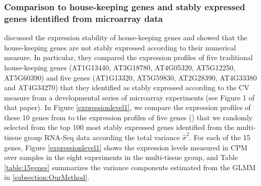 	
	
	\subsubsection{Comparison to house-keeping genes and stably expressed genes
		identified from microarray data}\label{section:CompareStablyExpressedGene}
	\citet{czechowski2005genome} discussed the expression stability of
	house-keeping genes and showed that the house-keeping genes are not stably
	expressed according to their numerical measure. In particular, they compared
	the expression profiles of five traditional house-keeping genes (AT1G13440,
	AT3G18780, AT4G05320, AT5G12250, AT5G60390) and five genes (AT1G13320,
	AT5G59830, AT2G28390, AT4G33380 and AT4G34270) that they identified  as stably
	expressed according to the CV measure from a developmental series of
	microarray experiments (see Figure 1 of that paper).  
	In Figure \ref{expressionlevel1}, we compare the expression profiles 
	of these 10 genes from \citet{czechowski2005genome} to the expression profiles
	of five genes (\SelectFiveGene) that we
	randomly selected from the top 100 most stably expressed genes identified from
	the multi-tissue group RNA-Seq data according the total variance $\hat\sigma^2$.
	For each of the 15 genes, Figure \ref{expressionlevel1} shows the expression levels measured
	in CPM over \howmanytissuesample samples in the eight experiments in the multi-tissue group,
	and Table \ref{table:15genes} summarizes the variance components estimated from the
	GLMM in \ref{subsection:OurMethod}. 
	
